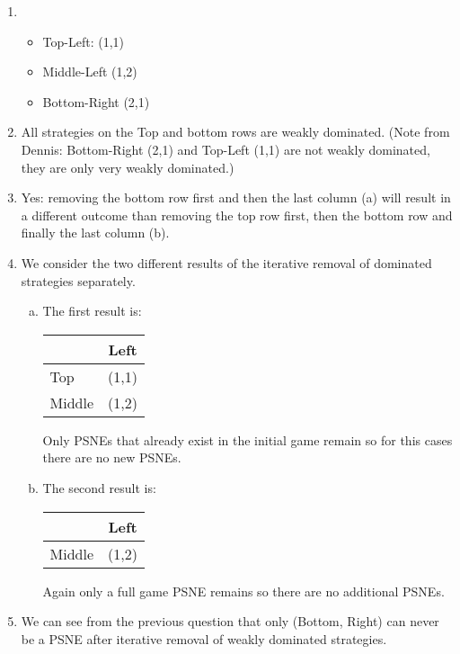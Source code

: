 \documentclass[../main.tex]{subfiles}
\begin{document}
\begin{solution} 

    \begin{enumerate}
    	\item 
    		\begin{itemize}
	    		\item Top-Left: (1,1)
	    		\item Middle-Left (1,2)
	    		\item Bottom-Right (2,1)
    		\end{itemize}
    	\item
    		All strategies on the Top and bottom rows are weakly dominated. (Note from Dennis:  Bottom-Right (2,1) and Top-Left (1,1) are not weakly dominated, they are only very weakly dominated.)
    	\item Yes: removing the bottom row first and then the last column (a) will result in a different outcome than removing the top row first, then the bottom row and finally the last column (b).
    	\item We consider the two different results of the iterative removal of dominated strategies separately.
			\begin{enumerate}[(a)]
				\item The first result is: \\
					\begin{center}
						\begin{tabular}{|l|c|}
							\hline
							& Left \\
							\hline
							Top & (1,1) \\
							\hline
							Middle & (1,2) \\
							\hline
						\end{tabular}
					\end{center}
					Only PSNEs that already exist in the initial game remain so for this cases there are no new PSNEs.
			\item  The second result is: \\
				\begin{center}
					\begin{tabular}{|l|c|}
						\hline
						& Left \\
						\hline
						Middle & (1,2) \\
						\hline
					\end{tabular}
				\end{center}
				Again only a full game PSNE remains so there are no additional PSNEs.
			\end{enumerate}
    	\item We can see from the previous question that only (Bottom, Right) can never be a PSNE after iterative removal of weakly dominated strategies. 
    \end{enumerate}
\end{solution}
\end{document}
